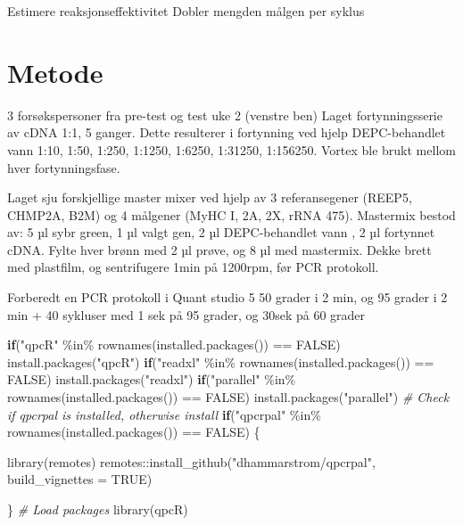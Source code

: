 \documentclass[
]{book}
\newenvironment{Shaded}{\begin{snugshade}}{\end{snugshade}}
\newcommand{\AttributeTok}[1]{\textcolor[rgb]{0.77,0.63,0.00}{#1}}
\newcommand{\CommentTok}[1]{\textcolor[rgb]{0.56,0.35,0.01}{\textit{#1}}}
\newcommand{\ConstantTok}[1]{\textcolor[rgb]{0.00,0.00,0.00}{#1}}
\newcommand{\ControlFlowTok}[1]{\textcolor[rgb]{0.13,0.29,0.53}{\textbf{#1}}}
\newcommand{\FunctionTok}[1]{\textcolor[rgb]{0.00,0.00,0.00}{#1}}
\newcommand{\NormalTok}[1]{#1}
\newcommand{\SpecialCharTok}[1]{\textcolor[rgb]{0.00,0.00,0.00}{#1}}
\newcommand{\StringTok}[1]{\textcolor[rgb]{0.31,0.60,0.02}{#1}}
\begin{document}
Estimere reaksjonseffektivitet
Dobler mengden målgen per syklus

\hypertarget{metode-1}{%
\section{Metode}\label{metode-1}}

3 forsøkspersoner fra pre-test og test uke 2 (venstre ben)
Laget fortynningsserie av cDNA 1:1, 5 ganger. Dette resulterer i fortynning ved hjelp DEPC-behandlet vann 1:10, 1:50, 1:250, 1:1250, 1:6250, 1:31250, 1:156250. Vortex ble brukt mellom hver fortynningsfase.

Laget sju forskjellige master mixer ved hjelp av 3 referansegener (REEP5, CHMP2A, B2M) og 4 målgener (MyHC I, 2A, 2X, rRNA 475).
Mastermix bestod av: 5 µl sybr green, 1 µl valgt gen, 2 µl DEPC-behandlet vann , 2 µl fortynnet cDNA.
Fylte hver brønn med 2 µl prøve, og 8 µl med mastermix.
Dekke brett med plastfilm, og sentrifugere 1min på 1200rpm, før PCR protokoll.

Forberedt en PCR protokoll i Quant studio 5
50 grader i 2 min, og 95 grader i 2 min + 40 sykluser med 1 sek på 95 grader, og 30sek på 60 grader

\begin{Shaded}
\begin{Highlighting}[]
\ControlFlowTok{if}\NormalTok{(}\StringTok{"qpcR"} \SpecialCharTok{\%in\%} \FunctionTok{rownames}\NormalTok{(}\FunctionTok{installed.packages}\NormalTok{()) }\SpecialCharTok{==} \ConstantTok{FALSE}\NormalTok{) }\FunctionTok{install.packages}\NormalTok{(}\StringTok{"qpcR"}\NormalTok{)}
\ControlFlowTok{if}\NormalTok{(}\StringTok{"readxl"} \SpecialCharTok{\%in\%} \FunctionTok{rownames}\NormalTok{(}\FunctionTok{installed.packages}\NormalTok{()) }\SpecialCharTok{==} \ConstantTok{FALSE}\NormalTok{) }\FunctionTok{install.packages}\NormalTok{(}\StringTok{"readxl"}\NormalTok{)}
\ControlFlowTok{if}\NormalTok{(}\StringTok{"parallel"} \SpecialCharTok{\%in\%} \FunctionTok{rownames}\NormalTok{(}\FunctionTok{installed.packages}\NormalTok{()) }\SpecialCharTok{==} \ConstantTok{FALSE}\NormalTok{) }\FunctionTok{install.packages}\NormalTok{(}\StringTok{"parallel"}\NormalTok{)}
\CommentTok{\# Check if qpcrpal is installed, otherwise install}
\ControlFlowTok{if}\NormalTok{(}\StringTok{"qpcrpal"} \SpecialCharTok{\%in\%} \FunctionTok{rownames}\NormalTok{(}\FunctionTok{installed.packages}\NormalTok{()) }\SpecialCharTok{==} \ConstantTok{FALSE}\NormalTok{) \{}
  
  \FunctionTok{library}\NormalTok{(remotes)}
\NormalTok{  remotes}\SpecialCharTok{::}\FunctionTok{install\_github}\NormalTok{(}\StringTok{"dhammarstrom/qpcrpal"}\NormalTok{, }\AttributeTok{build\_vignettes =} \ConstantTok{TRUE}\NormalTok{)}
  
\NormalTok{\}}
\CommentTok{\# Load packages}
\FunctionTok{library}\NormalTok{(qpcR)}
\end{Highlighting}
\end{Shaded}
\end{document}
